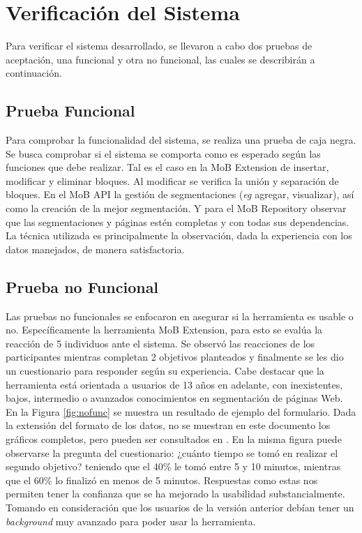 \documentclass[10pt]{revecom}
\begin{document}
\section{Verificación del Sistema}
\label{resultados}
Para verificar el sistema desarrollado, se llevaron a cabo dos pruebas de aceptación, una funcional y otra no funcional, las cuales se describirán a continuación. 

\subsection{Prueba Funcional}
Para comprobar la funcionalidad del sistema, se realiza una prueba de caja negra. 
Se busca comprobar si el sistema se comporta como es esperado según las funciones que debe realizar. Tal es el caso en la MoB Extension de insertar, modificar y eliminar bloques. Al modificar se verifica la unión y separación de bloques. En el MoB API la gestión de segmentaciones (\emph{eg} agregar, visualizar), así como la creación de la mejor segmentación. Y para el MoB Repository observar que las segmentaciones y páginas estén completas y con todas sus dependencias.
%
La técnica utilizada es principalmente la observación, dada la experiencia con los datos manejados, de manera satisfactoria.

\subsection{Prueba no Funcional}
Las pruebas no funcionales se enfocaron en asegurar si la herramienta es usable o no. Específicamente la herramienta MoB Extension, para esto se evalúa la reacción de 5 individuos ante el sistema. Se observó las reacciones de los participantes mientras completan 2 objetivos planteados y finalmente se les dio un cuestionario para responder según su experiencia. Cabe destacar que la herramienta está orientada a usuarios de 13 años en adelante, con inexistentes, bajos, intermedio o avanzados conocimientos en segmentación de páginas Web. 
En la Figura \ref{fig:nofunc} se muestra un resultado de ejemplo del formulario. 
Dada la extensión del formato de los datos, no se muestran en este documento los gráficos completos, pero pueden ser consultados en \cite{GARCIA2018}. En la misma figura puede observarse la pregunta del cuestionario: ¿cuánto tiempo se tomó en realizar el segundo objetivo? teniendo que el 40\% le tomó entre 5 y 10 minutos, mientras que el 60\% lo finalizó en menos de 5 minutos.
%
Respuestas como estas nos permiten tener la confianza que se ha mejorado la usabilidad substancialmente. Tomando en consideración que los usuarios de la versión anterior debían tener un \emph{background} muy avanzado para poder usar la herramienta.
\end{document}
